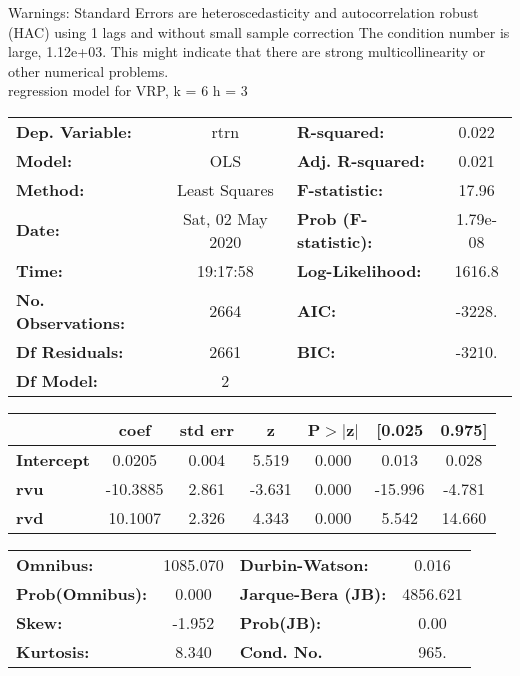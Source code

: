Warnings: \newline
 [1] Standard Errors are heteroscedasticity and autocorrelation robust (HAC) using 1 lags and without small sample correction \newline
 [2] The condition number is large, 1.12e+03. This might indicate that there are \newline
 strong multicollinearity or other numerical problems.\\ 

regression model for VRP, k = 6 h = 3\begin{center}
\begin{tabular}{lclc}
\toprule
\textbf{Dep. Variable:}    &       rtrn       & \textbf{  R-squared:         } &     0.022   \\
\textbf{Model:}            &       OLS        & \textbf{  Adj. R-squared:    } &     0.021   \\
\textbf{Method:}           &  Least Squares   & \textbf{  F-statistic:       } &     17.96   \\
\textbf{Date:}             & Sat, 02 May 2020 & \textbf{  Prob (F-statistic):} &  1.79e-08   \\
\textbf{Time:}             &     19:17:58     & \textbf{  Log-Likelihood:    } &    1616.8   \\
\textbf{No. Observations:} &        2664      & \textbf{  AIC:               } &    -3228.   \\
\textbf{Df Residuals:}     &        2661      & \textbf{  BIC:               } &    -3210.   \\
\textbf{Df Model:}         &           2      & \textbf{                     } &             \\
\bottomrule
\end{tabular}
\begin{tabular}{lcccccc}
                   & \textbf{coef} & \textbf{std err} & \textbf{z} & \textbf{P$> |$z$|$} & \textbf{[0.025} & \textbf{0.975]}  \\
\midrule
\textbf{Intercept} &       0.0205  &        0.004     &     5.519  &         0.000        &        0.013    &        0.028     \\
\textbf{rvu}       &     -10.3885  &        2.861     &    -3.631  &         0.000        &      -15.996    &       -4.781     \\
\textbf{rvd}       &      10.1007  &        2.326     &     4.343  &         0.000        &        5.542    &       14.660     \\
\bottomrule
\end{tabular}
\begin{tabular}{lclc}
\textbf{Omnibus:}       & 1085.070 & \textbf{  Durbin-Watson:     } &    0.016  \\
\textbf{Prob(Omnibus):} &   0.000  & \textbf{  Jarque-Bera (JB):  } & 4856.621  \\
\textbf{Skew:}          &  -1.952  & \textbf{  Prob(JB):          } &     0.00  \\
\textbf{Kurtosis:}      &   8.340  & \textbf{  Cond. No.          } &     965.  \\
\bottomrule
\end{tabular}
\end{center}

